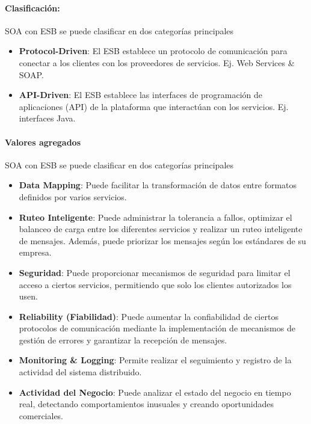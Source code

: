 \documentclass{article}
\begin{document}
		\paragraph{Clasificación:} SOA con ESB se puede clasificar en dos categorías principales
		\begin{itemize}		

			\item \textbf{Protocol-Driven}: El ESB establece un protocolo de comunicación para conectar a los clientes con los proveedores de servicios. Ej. Web Services \& SOAP.
			
			\item \textbf{API-Driven}: El ESB establece las interfaces de programación de aplicaciones (API) de la plataforma que interactúan con los servicios. Ej. interfaces Java.
			
		\end{itemize}
		
			
		\paragraph{Valores agregados} SOA con ESB se puede clasificar en dos categorías principales
		\begin{itemize}		
			
			\item \textbf{Data Mapping}: Puede facilitar la transformación de datos entre formatos definidos por varios servicios.
			
			\item \textbf{Ruteo Inteligente}: Puede administrar la tolerancia a fallos, optimizar el balanceo de carga entre los diferentes servicios y realizar un ruteo inteligente de mensajes. Además, puede priorizar los mensajes según los estándares de su empresa.
			
						
			\item \textbf{Seguridad}: Puede proporcionar mecanismos de seguridad para limitar el acceso a ciertos servicios, permitiendo que solo los clientes autorizados los usen.
			
			
			\item \textbf{Reliability (Fiabilidad)}: Puede aumentar la confiabilidad de ciertos protocolos de comunicación mediante la implementación de mecanismos de gestión de errores y garantizar la recepción de mensajes.
			
						
			\item \textbf{Monitoring \& Logging}: Permite realizar el seguimiento y registro de la actividad del sistema distribuido.
			
			\item \textbf{Actividad del Negocio}: Puede analizar el estado del negocio en tiempo real, detectando comportamientos inusuales y creando oportunidades comerciales.
			
			
		\end{itemize}
		
\end{document}
